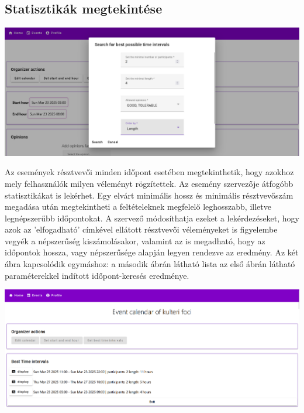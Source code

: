 \documentclass[a4paper,12pt]{report}
\theoremstyle{definition}
\theoremstyle{remark}
\begin{document}
	\subsection{Statisztikák megtekintése}

\begin{center}
\includegraphics[width=150mm]{get_best_dialog}
\captionsetup{width=0.8\linewidth}
\end{center}

Az események résztvevői minden időpont esetében megtekinthetik, hogy azokhoz mely felhasználók milyen véleményt rögzítettek. Az esemény szervezője átfogóbb statisztikákat is lekérhet. Egy elvárt minimális hossz és minimális résztvevőszám megadása után megtekintheti a feltételeknek megfelelő leghosszabb, illetve legnépszerűbb időpontokat. A szervező módosíthatja ezeket a lekérdezéseket, hogy azok az 'elfogadható' címkével ellátott résztvevői véleményeket is figyelembe vegyék a népszerűség kiszámolásakor, valamint az is megadható, hogy az időpontok hossza, vagy népszerűsége alapján legyen rendezve az eredmény. Az két ábra kapcsolódik egymáshoz: a második ábrán látható lista az első ábrán látható paraméterekkel indított időpont-keresés eredménye.

\begin{center}
\includegraphics[width=150mm]{best_time_intervals}
\captionsetup{width=0.8\linewidth}
\end{center}
\end{document}
